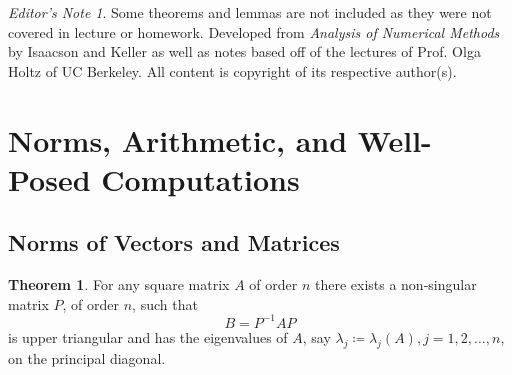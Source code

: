 \documentclass[11pt,letterpaper]{article}
\numberwithin{figure}{section} %
\newcommand{\inv}[1]{#1^{-1}}
\theoremstyle{definition}
\newtheorem{theorem}{Theorem}[subsection]
\theoremstyle{definition}
\theoremstyle{definition}
\theoremstyle{definition}
\theoremstyle{definition}
\theoremstyle{remark}
\theoremstyle{remark}
\theoremstyle{definition}
\theoremstyle{remark}
\theoremstyle{remark}
\newtheorem*{ednote}{Editor's Note}
\begin{document}
\begin{multicols*}{3}

\begin{ednote}
	Some theorems and lemmas are not included as they were not covered in lecture
	or homework. Developed from \textit{Analysis of Numerical Methods} by
	Isaacson and Keller as well as notes based off of the lectures of Prof. Olga
	Holtz of UC Berkeley. All content is copyright of its respective author(s).
\end{ednote}
\section{Norms, Arithmetic, and Well-Posed Computations}
\subsection{Norms of Vectors and Matrices}
\begin{theorem}
	For any square matrix $A$ of order $n$ there exists a non-singular matrix $P$,
	of order $n$, such that
	\[
		B = \inv{P} A P
	\]
	is upper triangular and has the eigenvalues of $A$, say $\lambda_j \coloneqq
	\lambda_j(A), j = 1, 2, \ldots, n$, on the principal diagonal.


\end{theorem}
\end{multicols*}
\end{document}
